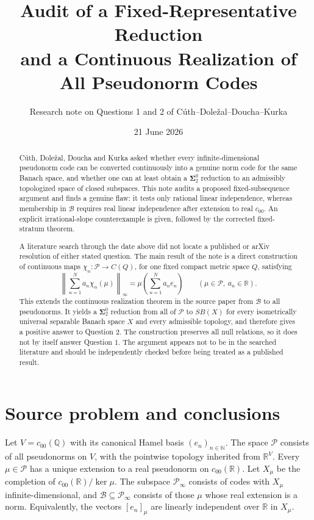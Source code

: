 \documentclass[11pt]{article}
\title{Audit of a Fixed-Representative Reduction\\
\large and a Continuous Realization of All Pseudonorm Codes}
\author{Research note on Questions 1 and 2 of C\'uth--Dole\v{z}al--Doucha--Kurka}
\date{21 June 2026}
\theoremstyle{definition}
\newcommand{\Pcal}{\mathcal P}
\newcommand{\Bcal}{\mathcal B}
\newcommand{\N}{\mathbb N}
\newcommand{\Q}{\mathbb Q}
\newcommand{\R}{\mathbb R}
\newcommand{\SigmaTwo}{\boldsymbol{\Sigma}^{0}_{2}}
\begin{document}
\maketitle

\begin{abstract}
C\'uth, Dole\v{z}al, Doucha and Kurka asked whether every infinite-dimensional
pseudonorm code can be converted continuously into a genuine norm code for the
same Banach space, and whether one can at least obtain a
$\SigmaTwo$ reduction to an admissibly topologized space of closed subspaces.
This note audits a proposed fixed-subsequence argument and finds a genuine flaw:
it tests only rational linear independence, whereas membership in $\Bcal$
requires real linear independence after extension to real $c_{00}$.  An explicit
irrational-slope counterexample is given, followed by the corrected fixed-stratum
theorem.

A literature search through the date above did not locate a published or arXiv
resolution of either stated question.  The main result of the note is a direct
construction of continuous maps
$\chi_n:\Pcal\to C(Q)$, for one fixed compact metric space $Q$, satisfying
\[
 \left\|\sum_{n=1}^N a_n\chi_n(\mu)\right\|_\infty
 =\mu\left(\sum_{n=1}^N a_ne_n\right)
 \qquad(\mu\in\Pcal,\ a_n\in\R).
\]
This extends the continuous realization theorem in the source paper from
$\Bcal$ to all pseudonorms.  It yields a $\SigmaTwo$ reduction from all of
$\Pcal$ to $SB(X)$ for every isometrically universal separable Banach space
$X$ and every admissible topology, and therefore gives a positive answer to
Question 2.  The construction preserves all null relations, so it does not by
itself answer Question 1.  The argument appears not to be in the searched
literature and should be independently checked before being treated as a
published result.
\end{abstract}

\section{Source problem and conclusions}

Let $V=c_{00}(\Q)$ with its canonical Hamel basis $(e_n)_{n\in\N}$.  The space
$\Pcal$ consists of all pseudonorms on $V$, with the pointwise topology inherited
from $\R^V$.  Every $\mu\in\Pcal$ has a unique extension to a real pseudonorm on
$c_{00}(\R)$.  Let $X_\mu$ be the completion of $c_{00}(\R)/\ker\mu$.  The
subspace $\Pcal_\infty$ consists of codes with $X_\mu$ infinite-dimensional, and
$\Bcal\subseteq\Pcal_\infty$ consists of those $\mu$ whose real extension is a
norm.  Equivalently, the vectors $[e_n]_\mu$ are linearly independent over
$\R$ in $X_\mu$.
\end{document}
